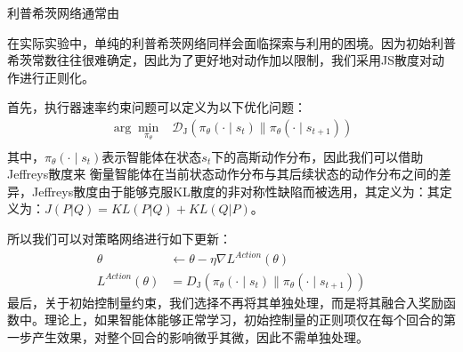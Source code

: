 利普希茨网络通常由

在实际实验中，单纯的利普希茨网络同样会面临探索与利用的困境。因为初始利普希茨常数往往很难确定，因此为了更好地对动作加以限制，我们采用JS散度对动作进行正则化。

首先，执行器速率约束问题可以定义为以下优化问题：
\begin{align}
    \arg \min _{\pi_{\theta}}&\mathcal{D}_{\mathrm{J}}\left(\pi_{\theta}(\cdot \mid s_{t}) \| \pi_{\theta}(\cdot \mid s_{t+1})\right)\\
\end{align}
其中，$\pi_{\theta}(\cdot \mid s_{t})$表示智能体在状态$s_{t}$下的高斯动作分布，因此我们可以借助Jeffreys散度来
衡量智能体在当前状态动作分布与其后续状态的动作分布之间的差异，Jeffreys散度由于能够克服KL散度的非对称性缺陷而被选用，其定义为：其定义为：$J(P|Q) = KL(P|Q)+KL(Q|P)$。

所以我们可以对策略网络进行如下更新：
\begin{align}
    \theta &\leftarrow \theta-\eta \nabla L^{Action}(\theta)\\
    L^{Action}(\theta)&={D}_{\mathrm{J}}\left(\pi_{\theta}(\cdot \mid s_{t}) \| \pi_{\theta}(\cdot \mid s_{t+1})\right)
\end{align}
最后，关于初始控制量约束，我们选择不再将其单独处理，而是将其融合入奖励函数中。理论上，如果智能体能够正常学习，初始控制量的正则项仅在每个回合的第一步产生效果，对整个回合的影响微乎其微，因此不需单独处理。
